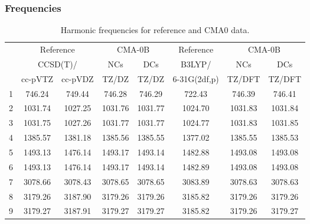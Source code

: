\documentclass[10pt,oneside]{article}
\begin{document}
\clearpage

\subsubsection*{Frequencies}
\begin{table}[h!]
\centering
\caption{Harmonic frequencies for reference and CMA0 data.}
\begin{tabular}{cccccccc}
\toprule
{} & \multicolumn{2}{c}{Reference} & \multicolumn{2}{c}{CMA-0B} &    Reference & \multicolumn{2}{c}{CMA-0B} \\
{} & \multicolumn{2}{c}{CCSD(T)/} &     NCs &     DCs &       B3LYP/ &     NCs &     DCs \\
{} &   cc-pVTZ & cc-pVDZ &   TZ/DZ &   TZ/DZ & 6-31G(2df,p) &  TZ/DFT &  TZ/DFT \\
\midrule
1 &    746.24 &  749.44 &  746.28 &  746.29 &       722.43 &  746.39 &  746.41 \\
2 &   1031.74 & 1027.25 & 1031.76 & 1031.77 &      1024.70 & 1031.83 & 1031.84 \\
3 &   1031.75 & 1027.26 & 1031.77 & 1031.77 &      1024.77 & 1031.83 & 1031.85 \\
4 &   1385.57 & 1381.18 & 1385.56 & 1385.55 &      1377.02 & 1385.55 & 1385.53 \\
5 &   1493.13 & 1476.14 & 1493.17 & 1493.14 &      1482.88 & 1493.08 & 1493.08 \\
6 &   1493.13 & 1476.14 & 1493.17 & 1493.14 &      1482.89 & 1493.08 & 1493.08 \\
7 &   3078.66 & 3078.43 & 3078.65 & 3078.65 &      3083.89 & 3078.63 & 3078.63 \\
8 &   3179.26 & 3187.90 & 3179.26 & 3179.26 &      3185.82 & 3179.26 & 3179.26 \\
9 &   3179.27 & 3187.91 & 3179.27 & 3179.27 &      3185.82 & 3179.26 & 3179.27 \\
\bottomrule
\end{tabular}
\end{table}

\clearpage
\end{document}

